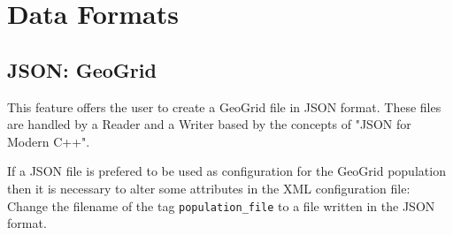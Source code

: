 
\section{Data Formats}
\label{section:DataFormats}

\subsection{JSON: GeoGrid}
This feature offers the user to create a GeoGrid file in JSON format. These files are handled by a Reader and a Writer based by the concepts of "JSON for Modern C++".

If a JSON file is prefered to be used as configuration for the GeoGrid population then it is necessary to alter some attributes in the XML configuration file:\\
Change the filename of the tag \texttt{population\_file} to a file written in the JSON format.

